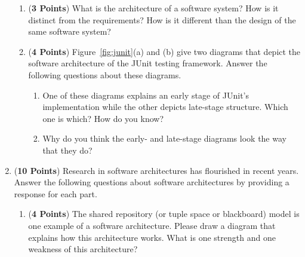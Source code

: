 \documentclass[12pt,epsf,psfig,graphicx]{article}
\begin{document}
\begin{enumerate}
\begin{enumerate}
\item ({\bf 3 Points}) What is the architecture of a software system? How is it distinct from the requirements? How is
	it different than the design of the same software system? 

\item ({\bf 4 Points}) Figure~\ref{fig:junit}(a) and (b) give two diagrams that depict the software
	architecture of the JUnit testing framework.  Answer the following questions about these diagrams.

	\begin{enumerate}
		\item One of these diagrams explains an early stage of JUnit's implementation while the other depicts late-stage
			structure.  Which one is which? How do you know?

		\item Why do you think the early- and late-stage diagrams look the way that they do?
	\end{enumerate}

% 

% 
\end{enumerate}

\newpage

\item ({\bf 10 Points}) Research in software architectures has flourished in recent years.  Answer the following
	questions about software architectures by providing a response for each part.

\begin{enumerate}

% 
	\item ({\bf 4 Points}) The shared repository (or tuple space or blackboard) model is one example of a
	software architecture.  Please draw a diagram that explains how this architecture works.  What is one strength and
	one weakness of this architecture?


\end{enumerate}
\end{enumerate}
\end{document}
